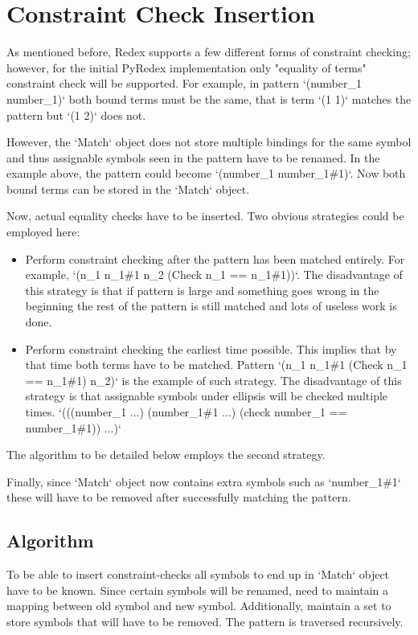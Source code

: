 \section{Constraint Check Insertion}
As mentioned before, Redex supports a few different forms of constraint checking; however, for the initial PyRedex implementation only "equality of terms" constraint check will be supported. For example, in pattern `(number\_1 number\_1)` both bound terms must be the same, that is term `(1 1)` matches the pattern but `(1 2)` does not. 

However, the `Match` object does not store multiple bindings for the same symbol and thus assignable symbols seen in the pattern have to be renamed. In the example above, the pattern could become `(number\_1 number\_1\#1)`. Now both bound terms can be stored in the `Match` object.

Now, actual equality checks have to be inserted. Two obvious strategies could be employed here:

\begin{itemize}
\item
Perform constraint checking after the pattern has been matched entirely. For example, `(n\_1 n\_1\#1 n\_2 (Check n\_1 == n\_1\#1))`. The disadvantage of this strategy is that if pattern is large and something goes wrong in the beginning the rest of the pattern is still matched and lots of useless work is done. 

\item
Perform constraint checking the earliest time possible. This implies that by that time both terms have to be matched. Pattern `(n\_1 n\_1\#1 (Check n\_1 == n\_1\#1) n\_2)` is the example of such strategy. The disadvantage of this strategy is that assignable symbols under ellipsis will be checked multiple times. `(((number\_1 ...) (number\_1\#1 ...) (check number\_1 == number\_1\#1)) ...)`
\end{itemize}
The algorithm to be detailed below employs the second strategy.

Finally, since `Match` object now contains extra symbols such as `number\_1\#1` these will have to be removed after successfully matching the pattern.

\subsection{Algorithm}
To be able to insert constraint-checks all symbols to end up in `Match` object have to be known. Since certain symbols will be renamed, need to maintain a mapping between old symbol and new symbol. Additionally, maintain a set to store symbols that will have to be removed. The pattern is traversed recursively. 


